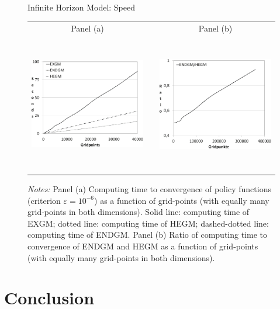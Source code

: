 \documentclass[a4paper,12pt]{article}
\begin{document}
\begin{figure}[htb]
	\caption{Infinite Horizon Model: Speed}
	\label{graph_infinte}
	\centering
	\begin{tabular}{cC{1cm}c}
	Panel (a) & & Panel (b)  \\
	\includegraphics[height=6.0cm, width=6.0cm]{Abbildungen/speed_all_finite_smart.eps} & & \includegraphics[height=6.0cm, width=6.0cm]{Abbildungen/rel_endgm_HEgm_infinite_smart.eps} \\
	\end{tabular}
	\caption*{\footnotesize{\emph{Notes:} Panel (a) Computing time to convergence of policy functions (criterion $\varepsilon=10^{-6}$) as a function of grid-points (with equally many grid-points in both dimensions). Solid line: computing time of EXGM; dotted line: computing time of HEGM; dashed-dotted line: computing time of ENDGM. Panel (b) Ratio of computing time to convergence of ENDGM and HEGM as a function of grid-points (with equally many grid-points in both dimensions).}}
\end{figure}

\clearpage

\section{Conclusion}
\end{document}
